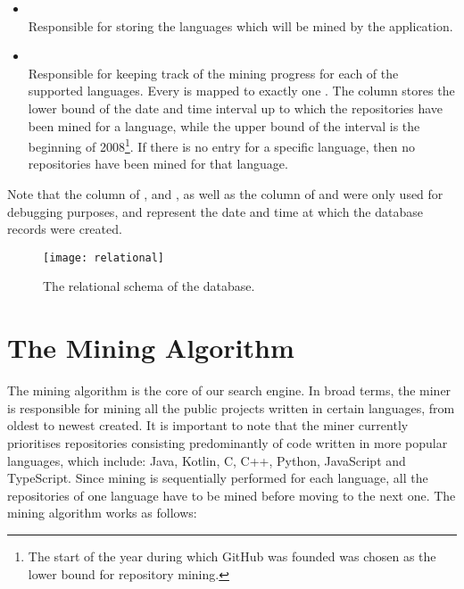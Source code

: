 \begin{itemize}
    \item {}
    \\Responsible for storing the languages which will be mined by the application.
    \item {}
    \\Responsible for keeping track of the mining progress for each of the supported languages. Every  is mapped to exactly one . The  column stores the lower bound of the date and time interval up to which the repositories have been mined for a language, while the upper bound of the interval is the beginning of 2008\footnote{The start of the year during which GitHub was founded was chosen as the lower bound for repository mining.}. If there is no entry for a specific language, then no repositories have been mined for that language.
\end{itemize}

Note that the  column of ,  and , as well as the  column of  and  were only used for debugging purposes, and represent the date and time at which the database records were created.

\begin{figure}[h!]
    \centering
    \texttt{[image: relational]}
    \caption[Relational database schema]{The relational schema of the database.}
    \label{fig:1}
\end{figure}

\newpage
\section{The Mining Algorithm}

The mining algorithm is the core of our search engine.
In broad terms, the miner is responsible for mining all the public projects written in certain languages, from oldest to newest created.
It is important to note that the miner currently prioritises repositories consisting predominantly of code written in more popular languages, which include: Java, Kotlin, C, C++, Python, JavaScript and TypeScript.
Since mining is sequentially performed for each language, all the repositories of one language have to be mined before moving to the next one.
The mining algorithm works as follows:

